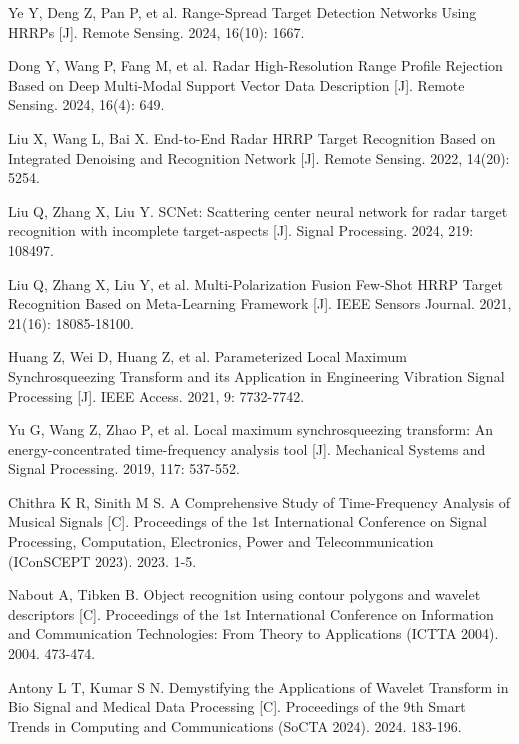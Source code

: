 \documentclass[doctor,twoside,ttf]{nudtpaper}
\begin{document}
\begin{thebibliography}{99}
 Ye Y, Deng Z, Pan P, et al. Range-Spread Target Detection Networks Using HRRPs [J]. Remote Sensing. 2024, 16(10): 1667.

 Dong Y, Wang P, Fang M, et al. Radar High-Resolution Range Profile Rejection Based on Deep Multi-Modal Support Vector Data Description [J]. Remote Sensing. 2024, 16(4): 649.

 Liu X, Wang L, Bai X. End-to-End Radar HRRP Target Recognition Based on Integrated Denoising and Recognition Network [J]. Remote Sensing. 2022, 14(20): 5254.

 Liu Q, Zhang X, Liu Y. SCNet: Scattering center neural network for radar target recognition with incomplete target-aspects [J]. Signal Processing. 2024, 219: 108497.

 Liu Q, Zhang X, Liu Y, et al. Multi-Polarization Fusion Few-Shot HRRP Target Recognition Based on Meta-Learning Framework [J]. IEEE Sensors Journal. 2021, 21(16): 18085-18100.

 Huang Z, Wei D, Huang Z, et al. Parameterized Local Maximum Synchrosqueezing Transform and its Application in Engineering Vibration Signal Processing [J]. IEEE Access. 2021, 9: 7732-7742.

 Yu G, Wang Z, Zhao P, et al. Local maximum synchrosqueezing transform: An energy-concentrated time-frequency analysis tool [J]. Mechanical Systems and Signal Processing. 2019, 117: 537-552.

 Chithra K R, Sinith M S. A Comprehensive Study of Time-Frequency Analysis of Musical Signals [C]. Proceedings of the 1st International Conference on Signal Processing, Computation, Electronics, Power and Telecommunication (IConSCEPT 2023). 2023. 1-5.

 Nabout A, Tibken B. Object recognition using contour polygons and wavelet descriptors [C]. Proceedings of the 1st International Conference on Information and Communication Technologies: From Theory to Applications (ICTTA 2004). 2004. 473-474.

 Antony L T, Kumar S N. Demystifying the Applications of Wavelet Transform in Bio Signal and Medical Data Processing [C]. Proceedings of the 9th Smart Trends in Computing and Communications (SoCTA 2024). 2024. 183-196.


\end{thebibliography}
\end{document}
